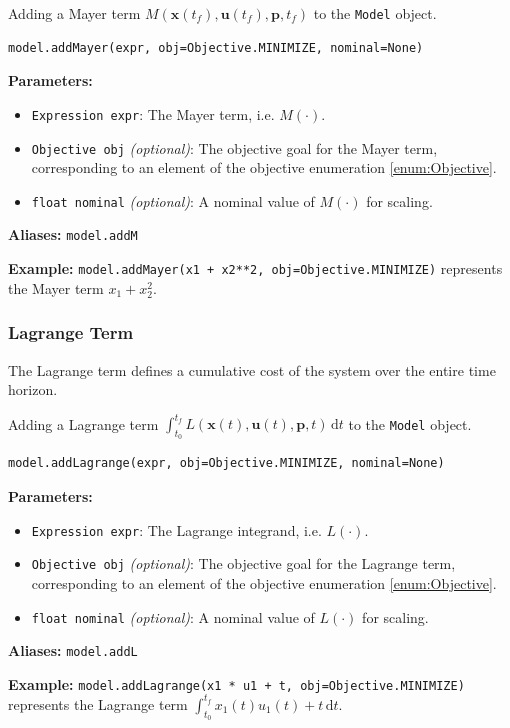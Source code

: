 \documentclass[12pt]{article}
\renewcommand{\v}{\bm}
\begin{document}
\begin{mdframed}[backgroundcolor=gray!10, roundcorner=10pt,
		linewidth=1pt]

	Adding a Mayer term $M(\v{x}(t_f), \v{u}(t_f), \v{p}, t_f)$ to
	the \texttt{Model} object.

	\begin{lstlisting}
model.addMayer(expr, obj=Objective.MINIMIZE, nominal=None)
		\end{lstlisting}
	\label{addMayer}
	\textbf{Parameters:}
	\begin{itemize}
		\item \texttt{Expression expr}: The Mayer term, i.e.
		      $M(\cdot)$.
		\item \texttt{Objective obj} \emph{(optional)}: The
		      objective goal for the Mayer term, corresponding to an
		      element of the objective
		      enumeration \eqref{enum:Objective}.
		\item \texttt{float nominal} \emph{(optional)}: A
		      nominal value of $M(\cdot)$ for scaling.
	\end{itemize}

	\textbf{Aliases:}  \texttt{model.addM}

	\textbf{Example:} \texttt{model.addMayer(x1 + x2**2,
		obj=Objective.MINIMIZE)} represents the Mayer term
	$x_1 + x_2^2$.
\end{mdframed}

\subsubsection{Lagrange Term}

The Lagrange term defines a cumulative cost of the system over the
entire time horizon.

\begin{mdframed}[backgroundcolor=gray!10, roundcorner=10pt,
		linewidth=1pt]

	Adding a Lagrange term $\int_{t_0}^{t_f} L(\v{x}(t), \v{u}(t),
		\v{p}, t) \, \mathrm{d}t$ to the \texttt{Model} object.

	\begin{lstlisting}
model.addLagrange(expr, obj=Objective.MINIMIZE, nominal=None)
	 	\end{lstlisting}
	\label{addLagrange}
	\textbf{Parameters:}
	\begin{itemize}
		\item \texttt{Expression expr}: The Lagrange integrand,
		      i.e. $L(\cdot)$.
		\item \texttt{Objective obj} \emph{(optional)}: The
		      objective goal for the Lagrange term, corresponding to an
		      element of the
		      objective enumeration \eqref{enum:Objective}.
		\item \texttt{float nominal} \emph{(optional)}: A
		      nominal value of $L(\cdot)$ for scaling.
	\end{itemize}

	\textbf{Aliases:}  \texttt{model.addL}

	\textbf{Example:} \texttt{model.addLagrange(x1 * u1 + t,
		obj=Objective.MINIMIZE)} represents the Lagrange term
	$\int_{t_0}^{t_f} x_1(t) u_1(t) + t \, \mathrm{d}t$.
\end{mdframed}
\end{document}
